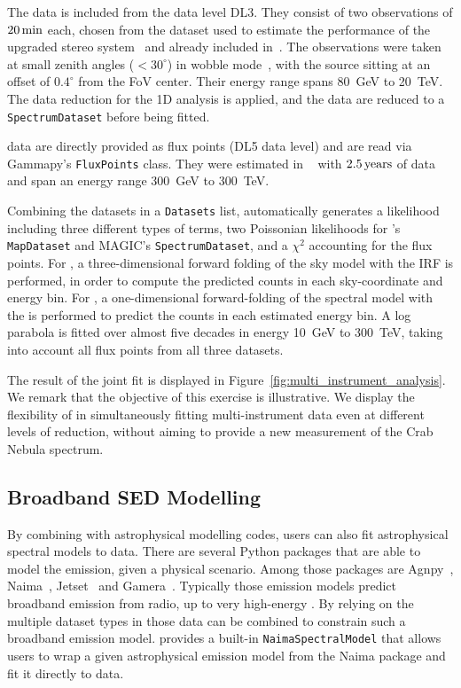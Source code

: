 \documentclass[longauth]{aa}
\newcommand{\code}[1]{\texttt{#1}}
\begin{document}
The \magic data is included from the data level DL3. They consist of two
observations of $20\,{\rm min}$ each, chosen from the dataset used to estimate
the performance of the upgraded stereo system~\citep{magic_performance} and
already included in~\cite{joint_crab}. The observations were taken at small
zenith angles ($<30^{\circ}$) in wobble mode~\citep{fomin_1994}, with the
source sitting at an offset of $0.4^{\circ}$ from the FoV center. Their energy
range spans \SI{80}{GeV} to \SI{20}{TeV}. The data reduction for the 1D analysis
is applied, and the data are reduced to a \code{SpectrumDataset} before being fitted.

\hawc data are directly provided as flux points (DL5 data level) and are read
via Gammapy's \code{FluxPoints} class. They were estimated in ~\cite{hawc_crab_2019}
with $2.5\,{\rm years}$ of data and span an energy range \SI{300}{GeV} to \SI{300}{TeV}.

Combining the datasets in a \code{Datasets} list, \gammapy automatically generates
a likelihood including three different types of terms, two Poissonian likelihoods
for \fermi's \code{MapDataset} and MAGIC's \code{SpectrumDataset}, and a $\chi^2$
accounting for the \hawc flux points. For \fermi, a three-dimensional forward folding
of the sky model with the IRF is performed, in order to compute the predicted counts
in each sky-coordinate and energy bin. For \magic, a one-dimensional forward-folding
of the spectral model with the \irfs is performed to predict the counts in each estimated energy bin. A log
parabola is fitted over almost five decades in energy \SI{10}{GeV} to \SI{300}{TeV}, taking into account all flux points from all three datasets.

The result of the joint fit is displayed in
Figure~\ref{fig:multi_instrument_analysis}. We remark that the objective of this
exercise is illustrative. We display the flexibility of \gammapy in
simultaneously fitting multi-instrument data even at different levels of
reduction, without aiming to provide a new measurement of the Crab Nebula
spectrum.


\subsection{Broadband SED Modelling}
\label{ssec:broadband-sed-modeling}
By combining \gammapy with astrophysical modelling codes, users can also fit
astrophysical spectral models to \gammaray data. 
There are several Python packages that are able to model
the \gammaray emission, given a physical scenario. Among those
packages are Agnpy~\citep{agnpy}, Naima~\citep{naima}, Jetset~\citep{jetset}
and Gamera~\citep{gamera}.
Typically those emission models predict broadband emission from
radio, up to very high-energy \gammarays.
By relying on the multiple dataset types in \gammapy those
data can be combined to constrain such a broadband emission model.
\gammapy provides a built-in \code{NaimaSpectralModel} that allows
users to wrap a given astrophysical emission model from the
Naima package and fit it directly to \gammaray data.
\end{document}
